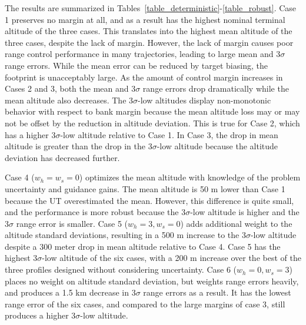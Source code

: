 \documentclass[journal ]{new-aiaa}
\begin{document}

The results are summarized in Tables~\ref{table_deterministic}-\ref{table_robust}. Case 1 preserves no margin at all, and as a result has the highest nominal terminal altitude of the three cases. This translates into the highest mean altitude of the three cases, despite the lack of margin. However, the lack of margin causes poor range control performance in many trajectories, leading to large mean and 3$\sigma$ range errors. While the mean error can be reduced by target biasing, the footprint is unacceptably large. As the amount of control margin increases in Cases 2 and 3, both the mean and 3$\sigma$ range errors drop dramatically while the mean altitude also decreases. The 3$\sigma$-low altitudes display non-monotonic behavior with respect to bank margin because the mean altitude loss may or may not be offset by the reduction in altitude deviation. This is true for Case 2, which has a higher 3$\sigma$-low altitude relative to Case 1. In Case 3, the drop in mean altitude is greater than the drop in the 3$\sigma$-low altitude because the altitude deviation has decreased further. 

Case 4 ($ w_h=w_s=0 $) optimizes the mean altitude with knowledge of the problem uncertainty and guidance gains. The mean altitude is 50 m lower than Case 1 because the UT overestimated the mean. However, this difference is quite small, and the performance is more robust because the 3$\sigma$-low altitude is higher and the 3$\sigma$ range error is smaller. Case 5 ($ w_h=3,w_s=0 $) adds additional weight to the altitude standard deviations, resulting in a 500 m increase to the 3$\sigma$-low altitude despite a 300 meter drop in mean altitude relative to Case 4. Case 5 has the highest 3$\sigma$-low altitude of the six cases, with a 200 m increase over the best of the three profiles designed without considering uncertainty. Case 6 ($ w_h=0, w_s=3$) places no weight on altitude standard deviation, but weights range errors heavily, and produces a 1.5 km decrease in 3$\sigma$ range errors as a result. It has the lowest range error of the six cases, and compared to the large margins of case 3, still produces a higher 3$\sigma$-low altitude.
\end{document}
